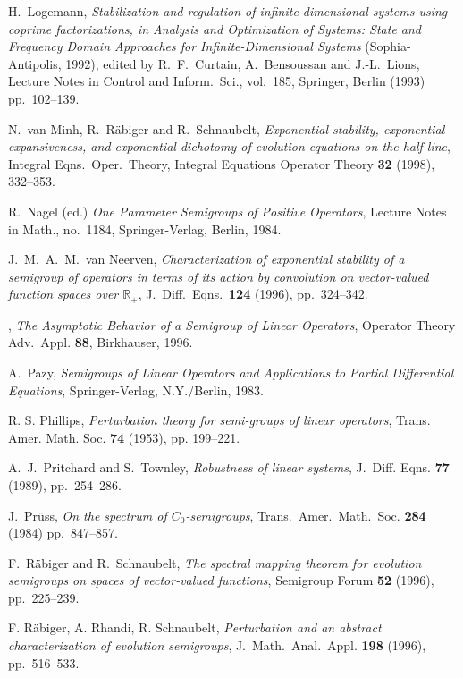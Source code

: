 \documentclass[10pt,psamsfonts,leqno]{siamltex}
\newcommand{\bbR}{\mathbb{R}}
\begin{document}
\begin{thebibliography}{99}
  {\sc H.~Logemann}, {\em Stabilization and regulation of
infinite-dimensional systems using coprime factorizations,
in Analysis and Optimization of Systems{\rm :} State and Frequency
Domain
Approaches for Infinite-Dimensional Systems} (Sophia-Antipolis, 1992),
edited by R.~F.~Curtain, A.~Bensoussan and J.-L.~Lions,
Lecture Notes in Control and Inform.~Sci., vol.~185, Springer, Berlin
(1993) pp.~102--139.

 {\sc N.~van Minh, R.~R\"abiger and R.~Schnaubelt},
{\em Exponential stability, exponential expansiveness, and exponential
dichotomy of evolution equations on the half-line},
Integral Eqns.~Oper.~Theory, Integral Equations Operator Theory
{\bf 32} (1998), 332--353.

 {\sc R.~Nagel} (ed.)
{\em One Parameter Semigroups of Positive Operators},
Lecture Notes in Math., no.~1184, Springer-Verlag, Berlin, 1984.

 {\sc J.~M.~A.~M.~van Neerven},
{\em Characterization of exponential stability of a semigroup of
operators in
terms of its action by convolution on vector-valued function spaces over
$\bbR_+$}, J.~Diff.~Eqns.~{\bf 124} (1996), pp.~324--342.

 \sameauthor,
{\em The Asymptotic Behavior of a Semigroup of Linear Operators},
Operator Theory Adv.~Appl. {\bf 88}, Birkhauser, 1996.

 {\sc A.~Pazy},
{\em Semigroups of Linear Operators and Applications to Partial
Differential Equations},
Springer-Verlag, N.Y./Berlin, 1983.

 {\sc R. S. Phillips}, {\em Perturbation theory for
semi-groups of linear operators}, Trans. Amer. Math. Soc.
{\bf  74}  (1953), pp. 199--221.

 {\sc A.~J.~Pritchard and S.~Townley}, {\em Robustness of
linear
systems}, J.~Diff. Eqns. {\bf 77} (1989), pp.~254--286.

 {\sc J.~Pr\"{u}ss}, {\em On the spectrum of
$C_0$-semigroups},
Trans.~Amer.~Math.~Soc. {\bf
284} (1984) pp.~847--857.

 {\sc F.~R\"{a}biger and R.~Schnaubelt},
{\em The spectral mapping theorem for evolution semigroups on spaces of
vector-valued functions}, Semigroup Forum {\bf 52} (1996), pp.~225--239.

  {\sc F. R\"{a}biger, A. Rhandi, R. Schnaubelt},
{\em Perturbation and an
abstract characterization of evolution semigroups},
J.~Math.~Anal.~Appl. {\bf 198} (1996), pp.~516--533.


\end{thebibliography}
\end{document}
